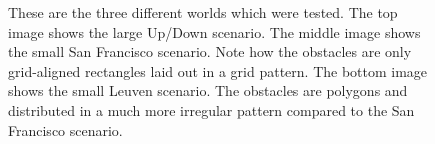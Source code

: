 \begin{figure}
	\centering


        
    \caption{These are the three different worlds which were tested. The top image shows the large Up/Down scenario. The middle image shows the small San Francisco scenario. Note how the obstacles are only grid-aligned rectangles laid out in a grid pattern. The bottom image shows the small Leuven scenario. The obstacles are polygons and distributed in a much more irregular pattern compared to the San Francisco scenario.}\label{fig:scenarios}
\end{figure}


